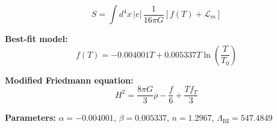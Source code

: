 
\begin{equation}
  S = \int d^4x \, |e| \, \frac{1}{16\pi G} \left[ f(T) + \mathcal{L}_m \right]
\end{equation}

\textbf{Best-fit model:}
\begin{equation}
  f(T) = -0.004001 T + 0.005337 T \ln\!\left(\frac{T}{T_0}\right)
\end{equation}

\textbf{Modified Friedmann equation:}
\begin{equation}
  H^2 = \frac{8\pi G}{3} \rho - \frac{f}{6} + \frac{T f_T}{3}
\end{equation}

\textbf{Parameters:}
$\alpha = -0.004001$, \quad
$\beta = 0.005337$, \quad
$n = 1.2967$, \quad
$\Lambda_{\text{BI}} = 547.4849$